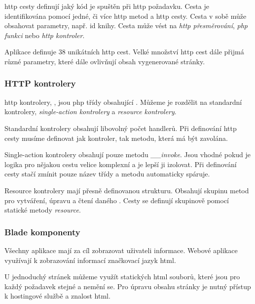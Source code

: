 \acrshort{http} cesty definují jaký kód je spuštěn při \acrshort{http} požadavku. Cesta je identifikována pomocí jedné, či více \acrshort{http} metod a \acrshort{http} cesty. Cesta v sobě může obsahovat parametry, např. id knihy. Cesta může vést na \emph{\acrshort{http} přesměrování}, \emph{\acrshort{php} funkci} nebo \emph{\acrshort{http} kontroler}.

Aplikace \bso definuje 38 unikátních \acrshort{http} cest. Velké množství \acrshort{http} cest dále přijmá různé parametry, které dále ovlivňují obsah vygenerované stránky.

\subsubsection{HTTP kontrolery}

\acrshort{http} kontrolery, \inlaravel, jsou \acrshort{php} třídy obsahující . Můžeme je rozdělit na standardní kontrolery, \emph{single-action kontrolery}\cite{laravel-controller-single-action} a \emph{resource kontrolery}\cite{laravel-controller-resource}.

Standardní kontrolery obsahují libovolný počet handlerů. Při definování \acrshort{http} cesty musíme definovat jak kontroler, tak metodu, která má být zavolána.

Single-action kontrolery obsahují pouze metodu \emph{\_\_invoke}. Jsou vhodné pokud je logika pro nějakou cestu velice komplexní a je lepší ji izolovat. Při definování cesty stačí zmínit pouze název třídy a  metodu automaticky spáruje.

Resource kontrolery mají přesně definovanou strukturu. Obsahují skupinu metod pro vytváření, úpravu a čtení daného . Cesty se definují skupinově pomocí statické metody \emph{resource}.

\subsubsection{Blade komponenty}

Všechny aplikace mají za cíl zobrazovat uživateli informace. Webové aplikace využívají k zobrazování informací značkovací jazyk \acrshort{html}.

U jednoduchý stránek můžeme využít statických \acrshort{html} souborů, které jsou pro každý požadavek stejné a nemění se. Pro úpravu obsahu stránky je nutný přístup k hostingové službě a znalost \acrshort{html}.

